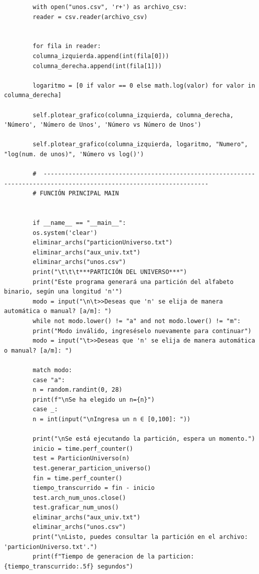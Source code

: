 \documentclass[11pt]{article} %
\begin{document}
\begin{lstlisting}
		with open("unos.csv", 'r+') as archivo_csv:
		reader = csv.reader(archivo_csv)
		
		
		for fila in reader:
		columna_izquierda.append(int(fila[0]))
		columna_derecha.append(int(fila[1]))
		
		logaritmo = [0 if valor == 0 else math.log(valor) for valor in columna_derecha]
		
		self.plotear_grafico(columna_izquierda, columna_derecha, 'Número', 'Número de Unos', 'Número vs Número de Unos')
		
		self.plotear_grafico(columna_izquierda, logaritmo, "Numero", "log(num. de unos)", 'Número vs log()')
		
		#  --------------------------------------------------------------------------------------------------------------------
		# FUNCIÓN PRINCIPAL MAIN
		
		
		if __name__ == "__main__":
		os.system('clear')
		eliminar_archs("particionUniverso.txt")
		eliminar_archs("aux_univ.txt")
		eliminar_archs("unos.csv")
		print("\t\t\t***PARTICIÓN DEL UNIVERSO***")
		print("Este programa generará una partición del alfabeto binario, según una longitud 'n'")
		modo = input("\n\t>>Deseas que 'n' se elija de manera automática o manual? [a/m]: ")
		while not modo.lower() != "a" and not modo.lower() != "m":
		print("Modo inválido, ingreséselo nuevamente para continuar")
		modo = input("\t>>Deseas que 'n' se elija de manera automática o manual? [a/m]: ")
		
		match modo:
		case "a":
		n = random.randint(0, 28)
		print(f"\nSe ha elegido un n={n}")
		case _:
		n = int(input("\nIngresa un n ∈ [0,100]: "))
		
		print("\nSe está ejecutando la partición, espera un momento.")
		inicio = time.perf_counter()
		test = ParticionUniverso(n)
		test.generar_particion_universo()
		fin = time.perf_counter()
		tiempo_transcurrido = fin - inicio
		test.arch_num_unos.close()
		test.graficar_num_unos()
		eliminar_archs("aux_univ.txt")
		eliminar_archs("unos.csv")
		print("\nListo, puedes consultar la partición en el archivo: 'particionUniverso.txt'.")
		print(f"Tiempo de generacion de la particion: {tiempo_transcurrido:.5f} segundos")
		
	\end{lstlisting}
	
	

	
	
\end{document}
